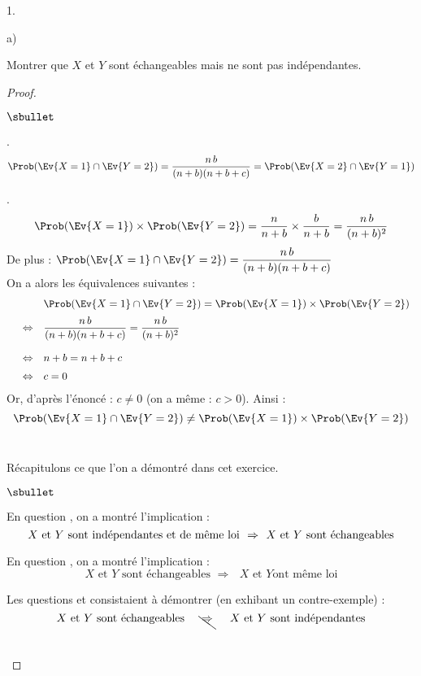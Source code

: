 \documentclass[11pt]{article}%
\begin{document}
\begin{noliste}{1.}
\begin{noliste}{a)}
\item Montrer que $X$ et $Y$ sont échangeables mais ne sont pas 
indépendantes.

\begin{proof}~
 \begin{noliste}{$\sbullet$}
  \item {}.
  \[
   \Prob(\Ev{X=1}\cap \Ev{Y=2}) = \dfrac{n \, b}{(n+b)(n+b+c)} =
   \Prob(\Ev{X=2}\cap \Ev{Y=1})
  \]
  
  \item {}.
  \[
   \Prob(\Ev{X=1}) \times \Prob(\Ev{Y=2}) = \dfrac{n}{n+b} \times 
   \dfrac{b}{n+b} = \dfrac{n\, b}{(n+b)^2}
  \]
  De plus : $\Prob(\Ev{X=1}\cap \Ev{Y=2}) = \dfrac{n\, 
  b}{(n+b)(n+b+c)}$\\[.2cm]
  On a alors les équivalences suivantes :
  \[
   \begin{array}{rcl}
    & & \Prob(\Ev{X=1}\cap \Ev{Y=2}) = \Prob(\Ev{X=1}) \times 
    \Prob(\Ev{Y=2})
    \\[.2cm]
    & \Leftrightarrow & \dfrac{n\, b}{(n+b)(n+b+c)} = \dfrac{n\, b}
    {(n+b)^2}
    \\[.6cm]
    & \Leftrightarrow & n+b = n+b+c
    \\[.2cm]
    & \Leftrightarrow & c=0
   \end{array}
  \]
  Or, d'après l'énoncé : $c\neq 0$ (on a même : $c>0$). Ainsi :
  \[
   \Prob(\Ev{X=1}\cap \Ev{Y=2}) \neq \Prob(\Ev{X=1}) \times 
   \Prob(\Ev{Y=2})
  \]
  ~\\[-.9cm]
 \end{noliste}
 \begin{remark}
  Récapitulons ce que l'on a démontré dans cet exercice.
  \begin{noliste}{$\sbullet$}
    \item En question , on a montré l'implication :
      \[
      \mbox{$X$ et $Y$ sont indépendantes et de même loi \
        $\Rightarrow$ \ $X$ et $Y$ sont échangeables}
      \]
    
    \item En question , on a montré l'implication :
      \[
      \mbox{$X$ et $Y$ sont échangeables \ $\Rightarrow$ \ $X$ et $Y$
        ont même loi}
      \]
    
    \item Les questions  et  consistaient à
      démontrer (en exhibant un contre-exemple) :
      \[
      \mbox{$X$ et $Y$ sont échangeables \quad
        \bcancel{\rule[-.2cm]{0cm}{.2cm} \!\!\! $\Rightarrow$ \!\!\!
          \rule[-.2cm]{0cm}{.2cm}} \quad $X$ et $Y$ sont
        indépendantes}
      \]      
  \end{noliste}
 \end{remark}~\\[-1.4cm]
\end{proof}

\end{noliste}
\end{noliste}
\end{document}

